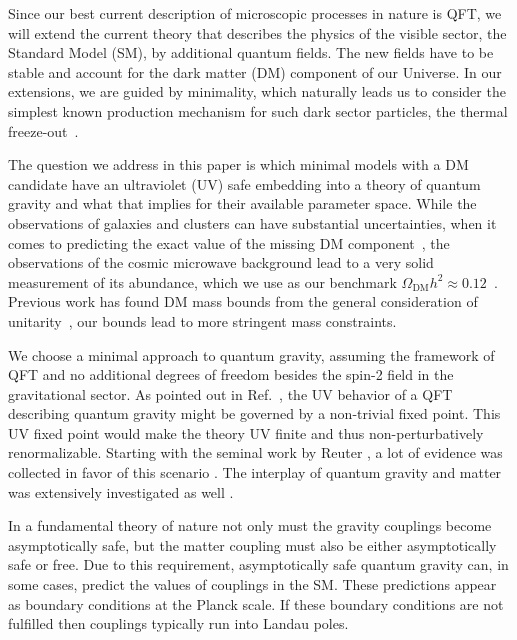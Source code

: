 \documentclass[aps,prd,twocolumn,preprintnumbers,superscriptaddress,nobibnotes,floatfix,longbibliography]{revtex4-1}
\begin{document}
Since our best current description of microscopic processes in nature is QFT, we will extend the current theory that describes the physics of the visible sector, the Standard Model (SM), by additional quantum fields. The new fields have to be stable and account for the dark matter (DM) component of our Universe. In our extensions, we are guided by minimality, which naturally leads us to consider the simplest known production mechanism for such dark sector particles, the thermal freeze-out~\cite{Zeldovich:1965gev, Lee:1977ua,Steigman:1984ac,Kolb:1990vq, hep-ph/9506380,Bertone:2004pz,1204.3622,Arcadi:2017kky,Roszkowski:2017nbc}. 

The question we address in this paper is which minimal models with a DM candidate have an ultraviolet (UV) safe embedding into a theory of quantum gravity and what that implies for their available parameter space. While the observations of galaxies and clusters can have substantial uncertainties, when it comes to predicting the exact value of the missing DM component~\cite{1809.05318}, the observations of the cosmic microwave background lead to a very solid measurement of its abundance, which we use as our benchmark $\Omega_\text{DM} h^2 \approx 0.12$~\cite{Aghanim:2018eyx}. Previous work has found DM mass bounds from the general consideration of unitarity~\cite{Griest:1989wd,1904.11503}, our bounds lead to more stringent mass constraints. 

We choose a minimal approach to quantum gravity, assuming the framework of QFT and no additional degrees of freedom besides the spin-2 field in the gravitational sector. 
As pointed out in Ref.~\cite{Weinberg:1980gg}, the UV behavior of a QFT describing quantum gravity might be governed by a non-trivial fixed point.
This UV fixed point would make the theory UV finite and thus non-perturbatively renormalizable.
Starting with the seminal work by Reuter \cite{Reuter:1996cp},
a lot of evidence was collected in favor of this scenario 
\cite{hep-th/0110054,0805.2909,1211.0955,1404.4537,1410.4815,1504.07656,1506.07016,1507.08859,1601.01800,1607.08460,1609.04813,1612.07315,1711.09259,1810.08550}.
The interplay of quantum gravity and matter was extensively investigated as well \cite{1311.2898,Meibohm:2015twa,1702.06539,Eichhorn:2018akn,1802.00498,1803.02355,Eichhorn:2018ydy,1812.08782,1907.02903}.

In a fundamental theory of nature not only must the gravity couplings become asymptotically safe,
but the matter coupling must also be either asymptotically safe or free.
Due to this requirement, asymptotically safe quantum gravity can, in some cases, predict the values of couplings in the SM.
These predictions appear as boundary conditions at the Planck scale.
If these boundary conditions are not fulfilled then couplings typically run into Landau poles.
\end{document}
